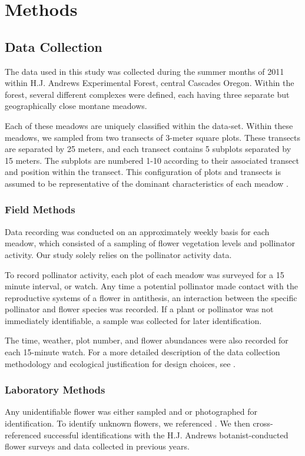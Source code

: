 \documentclass[twocolumn]{article}
\begin{document}
\section{Methods}

\subsection{Data Collection}
The data used in this study was collected during the summer months of
2011  within H.J. Andrews Experimental
Forest, central Cascades Oregon. Within the forest, several different complexes were
defined, each having three separate but geographically close montane
meadows.

Each of these meadows are uniquely classified within the data-set.
Within these meadows, we sampled from two transects of 3-meter square
plots. These transects are separated by 25 meters, and each transect
contains 5 subplots separated by 15 meters. The subplots are numbered 1-10 
according to their associated transect and position within the transect.
This configuration of
plots and transects is assumed to be representative of the dominant
characteristics of each meadow \cite{pfeiffer2012influence}.

\subsubsection{Field Methods}
Data recording was conducted on an approximately weekly basis for each
meadow, which consisted of a sampling of flower vegetation levels and
pollinator activity. Our study solely relies on the pollinator activity
data.

To record pollinator activity, each plot of each meadow was surveyed for
a 15  minute interval, or watch. Any time a potential pollinator made contact with
the reproductive systems of a flower in antithesis, an interaction between
the specific pollinator and flower species was recorded. If a plant or pollinator
was not immediately identifiable, a sample was collected for later
identification.

The time, weather, plot number, and flower abundances were also
recorded for each 15-minute watch. For a more detailed description of the
data collection methodology and ecological justification for design
choices, see \cite{pfeiffer2012influence}.

\subsubsection{Laboratory Methods}
Any unidentifiable flower was either sampled and or photographed
for identification. To identify unknown flowers, we referenced
\cite{mackinnon2004plants}. We then cross-referenced
successful identifications with the H.J. Andrews botanist-conducted
flower surveys and data collected in previous years.
\end{document}
